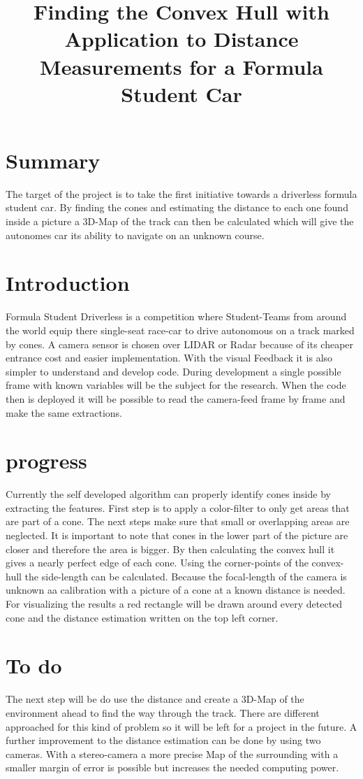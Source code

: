 \documentclass[10pt,a4paper]{article}
\title{Finding the Convex Hull with Application to Distance Measurements for a Formula Student Car}
\begin{document}
	\maketitle
	
	\section{Summary}
	The target of the project is to take the first initiative towards a driverless formula student car. By finding the cones and estimating the distance to each one found inside a picture a 3D-Map of the track can then be calculated which will give the autonomes car its ability to navigate on an unknown course. 
	
	\section{Introduction}
	Formula Student Driverless is a competition where Student-Teams from around the world equip there single-seat race-car to drive autonomous on a track marked by cones. A camera sensor is chosen over LIDAR or Radar because of its cheaper entrance cost and easier implementation. With the visual Feedback it is also simpler to understand and develop code. During development a single possible frame with known variables will be the subject for the research. When the code then is deployed it will be possible to read the camera-feed frame by frame and make the same extractions.
	
	\section{progress}
	Currently the self developed algorithm can properly identify cones inside by extracting the features. 
	First step is to apply a color-filter to only get areas that are part of a cone.
	The next steps make sure that small or overlapping areas are neglected. It is important to note that cones in the lower part of the picture are closer and therefore the area is bigger. By then calculating the convex hull it gives a nearly perfect edge of each cone.
	Using the corner-points of the convex-hull the side-length can be calculated. Because the focal-length of the camera is unknown aa calibration with a picture of a cone at a known distance is needed.
	For visualizing the results a red rectangle will be drawn around every detected cone and the distance estimation written on the top left corner.
	
	\section{To do}
	The next step will be do use the distance and create a 3D-Map of the environment ahead to find the way through the track. There are different approached for this kind of problem so it will be left for a project in the future.
	A further improvement to the distance estimation can be done by using two cameras. With a stereo-camera a more precise Map of the surrounding with a smaller margin of error is possible but increases the needed computing power.
	
\end{document}
